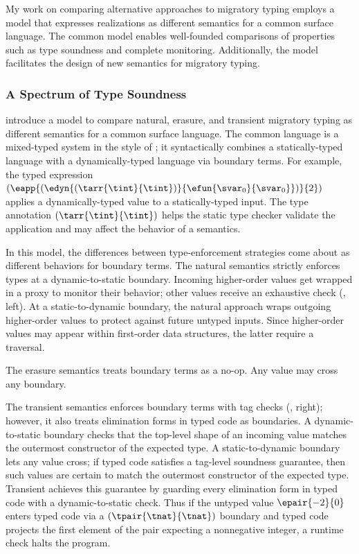 My work on comparing alternative approaches to migratory typing employs
 a model that expresses realizations as different semantics
 for a common surface language.
The common model enables well-founded comparisons of properties
 such as type soundness and complete monitoring.
Additionally, the model facilitates the design of new semantics for migratory
 typing.


\subsubsection{A Spectrum of Type Soundness}


\citet{gf-icfp-2018} introduce a model to compare natural, erasure, and
 transient migratory typing as different semantics for a common surface
 language.
The common language is a mixed-typed system in the style of \citet{mf-toplas-2009};
 it syntactically combines a statically-typed language with a dynamically-typed
 language via boundary terms.
For example, the typed expression
 $(\eapp{(\edyn{(\tarr{\tint}{\tint})}{\efun{\svar_0}{\svar_0}})}{2})$
 applies a dynamically-typed value to a statically-typed input.
The type annotation $(\tarr{\tint}{\tint})$ helps the static type checker
 validate the application and may affect the behavior of a semantics.

In this model, the differences between type-enforcement strategies
 come about as different behaviors for boundary terms.
The natural semantics strictly enforces types at a dynamic-to-static
 boundary.
Incoming higher-order values get wrapped in a proxy to monitor their
 behavior; other values receive an exhaustive check (, left).
At a static-to-dynamic boundary, the natural approach wraps outgoing
 higher-order values to protect against future untyped inputs.
Since higher-order values may appear within first-order data structures,
 the latter require a traversal.

The erasure semantics treats boundary terms as a no-op.
Any value may cross any boundary.

The transient semantics enforces boundary terms with tag checks (, right);
 however, it also treats elimination forms in typed code as boundaries.
A dynamic-to-static boundary checks that the top-level shape of an incoming
 value matches the outermost constructor of the expected type.
A static-to-dynamic boundary lets any value cross; if typed code satisfies a
 tag-level soundness guarantee, then such values are certain to match the
 outermost constructor of the expected type.
Transient achieves this guarantee by guarding every elimination form in typed
 code with a dynamic-to-static check.
Thus if the untyped value $\epair{{-2}}{{0}}$ enters typed code via a
 $(\tpair{\tnat}{\tnat})$ boundary and typed code projects the first element
 of the pair expecting a nonnegative integer, a runtime check halts the program.

